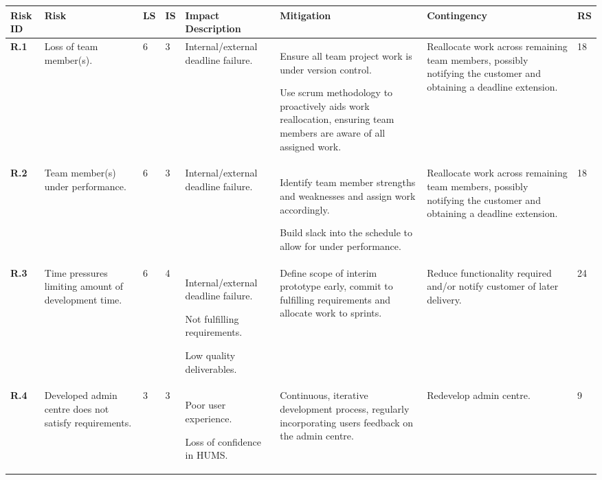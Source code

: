 \begin{longtable}[H]{| p{0.6cm} | p{2.2cm} | p{0.26cm} | p{0.26cm} | p{2.7cm} | p{3cm} | p{2.6cm} | p{0.4cm} |}
  \hline
  \cellcolor{titleColor}\textbf{Risk ID} &
  \cellcolor{titleColor}\textbf{Risk} &
  \cellcolor{titleColor}\textbf{LS} &
  \cellcolor{titleColor}\textbf{IS} &
  \cellcolor{titleColor}\textbf{Impact Description} &
  \cellcolor{titleColor}\textbf{Mitigation} &
  \cellcolor{titleColor}\textbf{Contingency} &
  \cellcolor{titleColor}\textbf{RS}\\
  
  \hline \textbf{R.1}
  & Loss of team member(s).
  & 6
  & 3
  & Internal/external deadline failure.
  & Ensure all team project work is under version control.
 
  Use scrum methodology to proactively aids work reallocation, ensuring team members are aware of all assigned work.
  & Reallocate work across remaining team members, possibly notifying the customer and obtaining a deadline extension.
  & 18 \\
  
  \hline \textbf{R.2}
  & Team member(s) under performance.
  & 6
  & 3
  & Internal/external deadline failure.
  & Identify team member strengths and weaknesses and assign work accordingly. 
  
  Build slack into the schedule to allow for under performance.
  & Reallocate work across remaining team members, possibly notifying the customer and obtaining a deadline extension.
  & 18 \\
  
  \hline \textbf{R.3}
  & Time pressures limiting amount of development time.
  & 6
  & 4
  & Internal/external deadline failure.
  
  Not fulfilling requirements.
  
  Low quality deliverables.
  & Define scope of interim prototype early, commit to fulfilling requirements and allocate work to sprints.
  & Reduce functionality required and/or notify customer of later delivery.
  & 24 \\
  
  \hline \textbf{R.4}
  & Developed admin centre does not satisfy requirements.
  & 3
  & 3
  & Poor user experience.
  
  Loss of confidence in HUMS.
  & Continuous, iterative development process, regularly incorporating users feedback on the admin centre.
  & Redevelop admin centre.
  & 9\\
  

\end{longtable}
